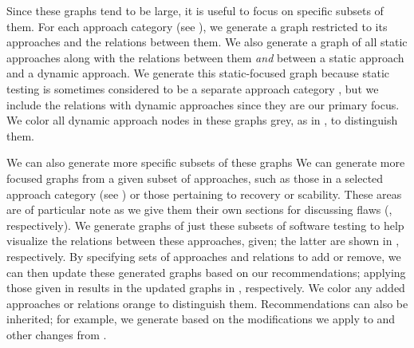 \fi
Since these graphs tend to be large, it is useful to focus on specific
subsets of them. \ifnotpaper For each approach category (see
    ), we generate a graph restricted to its approaches
    and the relations between them. We also generate a graph of all static
    approaches along with the relations between them \emph{and} between a
    static approach and a dynamic approach. We generate this static-focused
    graph because static testing is sometimes considered to be a separate
    approach category \citep[Fig.~2; see ]{IEEE2022},
    but we include the relations with dynamic approaches since they are our
    primary focus. We color all dynamic approach nodes in these graphs grey,
    as in , to distinguish them.

    We can also generate more specific subsets of these graphs
\else We can generate more focused graphs \fi from a given subset of
approaches, such as \ifnotpaper\else those in a selected approach category
    (see ) or \fi those pertaining to recovery or
scability\ifnotpaper. These areas are of particular note as we give them their
own sections for discussing flaws (, respectively).
We generate graphs of just these subsets of software testing to help visualize
the relations between these approaches, given\else; the latter are shown \fi
in , respectively. By
specifying sets of approaches and relations to add or remove, we can then
update these generated graphs based on our recommendations; applying those
given in 
results in the updated graphs in , respectively.
We color any added approaches or relations orange to distinguish them.
\ifnotpaper
    Recommendations can also be inherited; for example, we generate
     based on the modifications we apply to
     and
    other changes from .
\fi

\ifnotpaper
    
\else
    \sntxFlawsTable{}
    \smntcFlawsTable{}
\fi
